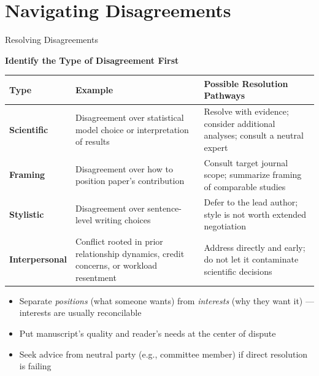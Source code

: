 \documentclass{beamer}
\begin{document}
\section{Navigating Disagreements}

\begin{frame}{Resolving Disagreements}

  \footnotesize
  \textbf{Identify the Type of Disagreement First}\\
  \smallskip

  {\scriptsize
  \begin{tabular}{@{}lp{3.6cm}p{4cm}@{}}
    \hline
    \textbf{Type} & \textbf{Example} & \textbf{Possible Resolution Pathways} \\
    \hline
    \textbf{Scientific}
      & Disagreement over statistical model choice
        or interpretation of results
      & Resolve with evidence; consider additional
        analyses; consult a neutral expert \\[3pt]
    \textbf{Framing}
      & Disagreement over how to position
        paper's contribution
      & Consult target journal scope; summarize framing of
        comparable studies \\[3pt]
    \textbf{Stylistic}
      & Disagreement over sentence-level writing choices
      & Defer to the lead author; style is not worth
        extended negotiation \\[3pt]
    \textbf{Interpersonal}
      & Conflict rooted in prior relationship dynamics,
        credit concerns, or workload resentment
      & Address directly and early; do not let it
        contaminate scientific decisions \\
    \hline
  \end{tabular}
  }

  \medskip
  \begin{itemize}
    \item Separate \emph{positions} (what someone wants)
      from \emph{interests} (why they want it) ---
      interests are usually reconcilable
    \item Put manuscript's quality and reader's
      needs at the center of dispute
    \item Seek advice from neutral party (e.g., committee member) if direct resolution
      is failing
  \end{itemize}

\end{frame}
\end{document}
